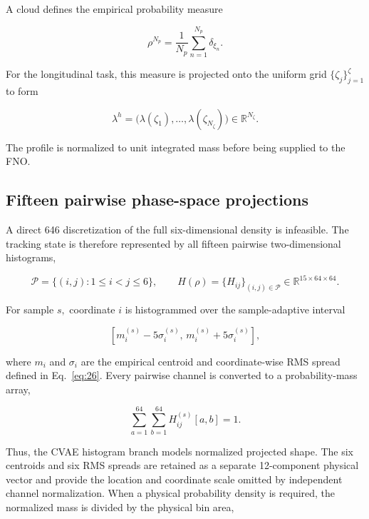 A cloud defines the empirical probability measure

\begin{equation}
\label{eq:46}
\rho^{N_p}=\frac1{N_p}\sum_{n=1}^{N_p}\delta_{\xi_n}.
\end{equation}

For the longitudinal task, this measure is projected onto the uniform grid \(\{ \zeta_{j} \}_{j = 1}^{\zeta}\) to form

\begin{equation}
\label{eq:47}
\lambda^h=\bigl(\lambda(\zeta_1),\ldots,\lambda(\zeta_{N_{\zeta}})\bigr)\in\mathbb R^{N_{\zeta}}.
\end{equation}

The profile is normalized to unit integrated mass before being supplied to the FNO.

\subsection{Fifteen pairwise phase-space projections}
\label{sec:03_simulation_workflow_fifteen_pairwise_phase_space_projections}

A direct 646 discretization of the full six-dimensional density is infeasible. The tracking state is therefore represented by all fifteen pairwise two-dimensional histograms,

\begin{equation}
\label{eq:48}
\mathcal P=\{(i,j):1\le i<j\le6\},\qquad H(\rho)=\{H_{ij}\}_{(i,j)\in\mathcal P}\in\mathbb R^{15\times64\times64}.
\end{equation}

For sample \(s ,\) coordinate \(i\) is histogrammed over the sample-adaptive interval

\begin{equation}
\label{eq:49}
\left[m_i^{(s)}-5\sigma_i^{(s)},\,m_i^{(s)}+5\sigma_i^{(s)}\right],
\end{equation}

where \(m_{i}\) and \(\sigma_{i}\) are the empirical centroid and coordinate-wise RMS spread defined in Eq.~\eqref{eq:26}. Every pairwise channel is converted to a probability-mass array,

\begin{equation}
\label{eq:50}
\sum_{a=1}^{64}\sum_{b=1}^{64}H_{ij}^{(s)}[a,b]=1.
\end{equation}

Thus, the CVAE histogram branch models normalized projected shape. The six centroids and six RMS spreads are retained as a separate 12-component physical vector and provide the location and coordinate scale omitted by independent channel normalization. When a physical probability density is required, the normalized mass is divided by the physical bin area,

